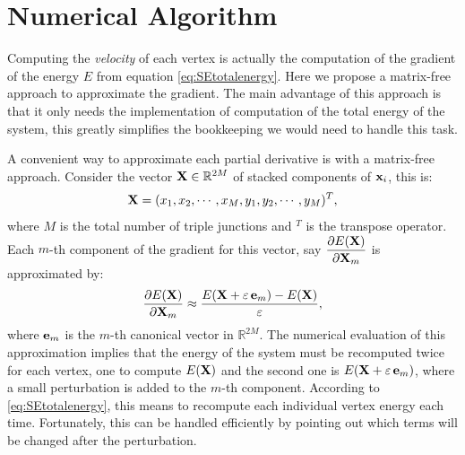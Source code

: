 \section{Numerical Algorithm}
\label{sec:se_numerical}

Computing the \emph{velocity} of each vertex is actually the computation of the gradient of the energy $E$ from equation \eqref{eq:SEtotalenergy}.
Here we propose a matrix-free approach to approximate the gradient.
The main advantage of this approach is that it only needs 
the implementation of computation of the total energy of the system, 
this greatly simplifies the bookkeeping we would need to handle this task.

A convenient way to approximate each partial derivative is with a  matrix-free approach.
Consider the vector $\X \in \mathbb{R}^{2M}$ of stacked components of 
$\x_i$, this is:
\begin{equation*}
    \X = (x_1, x_2, \cdots, x_M, y_1, y_2, \cdots, y_M)^T,
\end{equation*}
where $M$ is the total number of triple junctions and $^T$ is the transpose operator.
Each $m$-th component of the gradient for this vector, 
say $\dfrac{\partial E(\X)}{\partial \X_m}$ is approximated by:
%
\begin{equation}
    \frac{\partial E(\X)}{\partial \X_m} \approx 
    \frac{E(\X + \varepsilon\,  \ei{m}) - E(\X)}{\varepsilon},
    \label{eq:partialE}
\end{equation}
%
where $\mathbf{e}_{m}$ is the $m$-th canonical vector in $\mathbb{R}^{2M}$. The numerical evaluation of this approximation implies that the energy of the system must be recomputed twice for each vertex, 
one to compute $E(\X)$ and the second one is $E(\X + \varepsilon\,  \ei{m})$, where a small perturbation is added to the $m$-th component. According to \eqref{eq:SEtotalenergy}, this means to recompute each individual vertex energy each time.
Fortunately, this can be handled efficiently by pointing out 
which terms will be changed after the perturbation.

